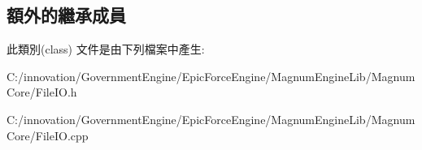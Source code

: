 \subsection*{額外的繼承成員}


此類別(class) 文件是由下列檔案中產生\+:\begin{DoxyCompactItemize}
\item 
C\+:/innovation/\+Government\+Engine/\+Epic\+Force\+Engine/\+Magnum\+Engine\+Lib/\+Magnum\+Core/File\+I\+O.\+h\item 
C\+:/innovation/\+Government\+Engine/\+Epic\+Force\+Engine/\+Magnum\+Engine\+Lib/\+Magnum\+Core/File\+I\+O.\+cpp\end{DoxyCompactItemize}

